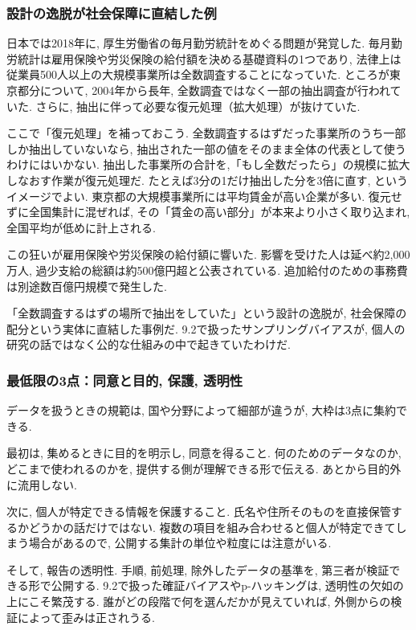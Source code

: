 \subsubsection*{設計の逸脱が社会保障に直結した例}

日本では2018年に, 厚生労働省の毎月勤労統計をめぐる問題が発覚した.
毎月勤労統計は雇用保険や労災保険の給付額を決める基礎資料の1つであり, 法律上は従業員500人以上の大規模事業所は全数調査することになっていた.
ところが東京都分について, 2004年から長年, 全数調査ではなく一部の抽出調査が行われていた.
さらに, 抽出に伴って必要な復元処理（拡大処理）が抜けていた.

ここで「復元処理」を補っておこう.
全数調査するはずだった事業所のうち一部しか抽出していないなら, 抽出された一部の値をそのまま全体の代表として使うわけにはいかない.
抽出した事業所の合計を,「もし全数だったら」の規模に拡大しなおす作業が復元処理だ.
たとえば3分の1だけ抽出した分を3倍に直す, というイメージでよい.
東京都の大規模事業所には平均賃金が高い企業が多い. 復元せずに全国集計に混ぜれば, その「賃金の高い部分」が本来より小さく取り込まれ, 全国平均が低めに計上される.

この狂いが雇用保険や労災保険の給付額に響いた.
影響を受けた人は延べ約2{,}000万人, 過少支給の総額は約500億円超と公表されている.
追加給付のための事務費は別途数百億円規模で発生した.

「全数調査するはずの場所で抽出をしていた」という設計の逸脱が, 社会保障の配分という実体に直結した事例だ.
9.2で扱ったサンプリングバイアスが, 個人の研究の話ではなく公的な仕組みの中で起きていたわけだ.

\subsubsection*{最低限の3点：同意と目的, 保護, 透明性}

データを扱うときの規範は, 国や分野によって細部が違うが, 大枠は3点に集約できる.

最初は, 集めるときに目的を明示し, 同意を得ること.
何のためのデータなのか, どこまで使われるのかを, 提供する側が理解できる形で伝える.
あとから目的外に流用しない.

次に, 個人が特定できる情報を保護すること.
氏名や住所そのものを直接保管するかどうかの話だけではない.
複数の項目を組み合わせると個人が特定できてしまう場合があるので, 公開する集計の単位や粒度には注意がいる.

そして, 報告の透明性. 手順, 前処理, 除外したデータの基準を, 第三者が検証できる形で公開する.
9.2で扱った確証バイアスやp-ハッキングは, 透明性の欠如の上にこそ繁茂する.
誰がどの段階で何を選んだかが見えていれば, 外側からの検証によって歪みは正されうる.


